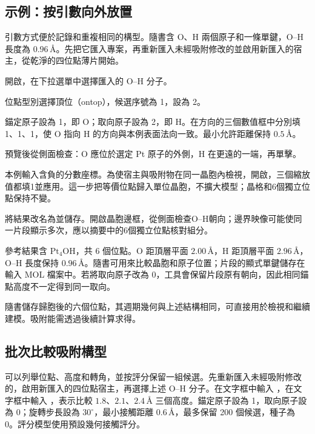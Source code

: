 \subsection{示例：按引數向外放置 }

引數方式便於記錄和重複相同的構型。隨書含 O、H 兩個原子和一條單鍵，O--H 長度為 $0.96\,\text{\AA}$。先把它匯入專案，再重新匯入未經吸附修改的並啟用新匯入的宿主，從乾淨的四位點薄片開始。

\begin{steps}
  \item 開啟，在下拉選單中選擇匯入的 O--H 分子。
  \item 位點型別選擇頂位（ontop），候選序號為 1，設為 2。
  \item 錨定原子設為 1，即 O；取向原子設為 2，即 H。在方向的三個數值框中分別填 1、1、1，使 O 指向 H 的方向與本例表面法向一致。最小允許距離保持 $0.5\,\text{\AA}$。
  \item 預覽後從側面檢查：O 應位於選定 Pt 原子的外側，H 在更遠的一端，再單擊。
  \item 本例輸入含負的分數座標。為使宿主與吸附物在同一晶胞內檢視，開啟，三個縮放值都填1並應用。這一步把等價位點歸入單位晶胞，不擴大模型；晶格和6個獨立位點保持不變。
  \item 將結果改名為並儲存。開啟晶胞邊框，從側面檢查O--H朝向；邊界映像可能使同一片段顯示多次，應以摘要中的6個獨立位點核對組分。
\end{steps}



參考結果含 $\mathrm{Pt_4OH}$，共 6 個位點。O 距頂層平面 $2.00\,\text{\AA}$，H 距頂層平面 $2.96\,\text{\AA}$，O--H 長度保持 $0.96\,\text{\AA}$。隨書可用來比較晶胞和原子位置；片段的顯式單鍵儲存在輸入 MOL 檔案中。若將取向原子改為 0，工具會保留片段原有朝向，因此相同錨點高度不一定得到同一取向。

隨書儲存歸胞後的六個位點，其週期幾何與上述結構相同，可直接用於檢視和繼續建模。吸附能需透過後續計算求得。

\subsection{批次比較吸附構型}

可以列舉位點、高度和轉角，並按評分保留一組候選。先重新匯入未經吸附修改的，啟用新匯入的四位點宿主，再選擇上述 O--H 分子。在文字框中輸入 ，在文字框中輸入 ，表示比較 $1.8$、$2.1$、$2.4\,\text{\AA}$ 三個高度。錨定原子設為 1，取向原子設為 0；旋轉步長設為 $30^\circ$，最小接觸距離 $0.6\,\text{\AA}$，最多保留 200 個候選，種子為 0。評分模型使用預設幾何接觸評分。

